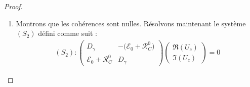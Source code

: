\documentclass[12pt,a4paper,openany,oneside]{book}
\begin{document}
{{{{{{\begin{proof}
\begin{enumerate}
  Ce qui entraine:
  
  \begin{eqnarray*}
   (S_{1})\Rightarrow \left\{
 \begin{split}
 -a_{1}U_{1}+a_{2}U_{2} &=0\\
 -a_{1}U_{1}+ a_{3}U_{3} &=0\\
 -a_{2}U_{2}+ a_{3}U_{3} &=0 
 \end{split}  
   \right. \Leftrightarrow\left\{
 \begin{split}
U_{2}&=\dfrac{a_{1}}{a_{2}}U_{1}\\
U_{3} &= \dfrac{a_{1}}{a_{3}}U_{1}\\
U_{3} &= \dfrac{a_{2}}{a_{3}}U_{2} 
 \end{split}  
   \right.  
  \end{eqnarray*}
  
  De plus 
  $$ U_{1}+ U_{2}+U_{3}=1 $$
alors 
\begin{eqnarray*}
U_{1}+\dfrac{a_{1}}{a_{2}}U_{1}  + \dfrac{a_{1}}{a_{3}}U_{1} =1\Leftrightarrow
(1+\dfrac{a_{1}}{a_{2}}+\dfrac{a_{1}}{a_{3}})U_{1} =1
\end{eqnarray*}

On obtient donc 

\begin{eqnarray*}
\left\{
 \begin{split}
U_{1}&=\dfrac{a_{2}a_{3}}{a_{1}a_{2}+a_{1}a_{3}+ a_{2}a_{3}}\\
U_{2} &= \dfrac{a_{1}a_{3}}{a_{1}a_{2}+a_{1}a_{3}+ a_{2}a_{3}}\\
U_{3} &= \dfrac{a_{1}a_{2}}{a_{1}a_{2}+a_{1}a_{3}+ a_{2}a_{3}}
 \end{split}  
   \right.  
  \end{eqnarray*}
   
  \item Montrons que les cohérences sont nulles.
  Résolvons maintenant  le système  $(S_{2})$ défini comme suit :
 \begin{eqnarray*}
 (S_{2}):\begin{pmatrix}
   D_{\gamma}                &  -\big(\mathcal{E}_{0}+ \mathcal{R}^{0}_{C}\big)  \\
   \mathcal{E}_{0}+ \mathcal{R}^{0}_{C}  &  D_{\gamma}
\end{pmatrix}\begin{pmatrix} \Re(U_{c})\\ \Im(U_{c})\end{pmatrix}= 0
\end{eqnarray*}


\end{enumerate}
\end{proof}}}}}}}
\end{document}
